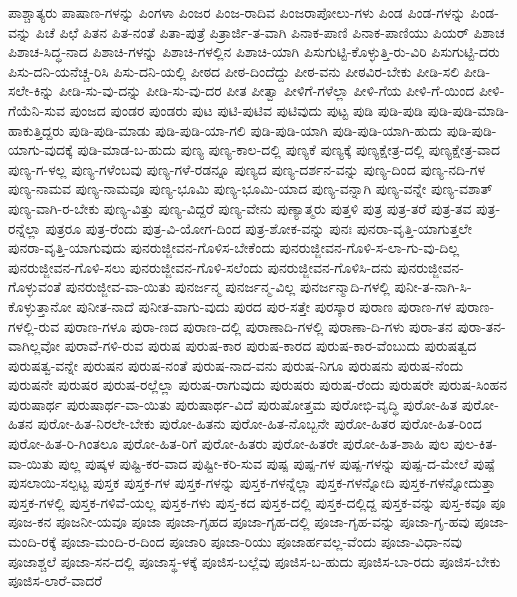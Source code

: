 {ಪಾಶ್ಚಾತ್ಯರು
ಪಾಷಾಣ-ಗಳನ್ನು
ಪಿಂಗಳಾ
ಪಿಂಜರ
ಪಿಂಜ-ರಾದಿವ
ಪಿಂಜರಾಪೋಲು-ಗಳು
ಪಿಂಡ
ಪಿಂಡ-ಗಳನ್ನು
ಪಿಂಡ-ವನ್ನು
ಪಿಚೆ
ಪಿಛೆ
ಪಿತನ
ಪಿತ-ನಂತೆ
ಪಿತಾ-ಪುತ್ರೆ
ಪಿತ್ರಾರ್ಜಿ-ತ-ವಾಗಿ
ಪಿನಾಕ-ಪಾಣಿ
ಪಿನಾಕ-ಪಾಣಿಯು
ಪಿಯರ್
ಪಿಶಾಚ
ಪಿಶಾಚ-ಸಿದ್ಧ-ನಾದ
ಪಿಶಾಚಿ-ಗಳನ್ನು
ಪಿಶಾಚಿ-ಗಳಲ್ಲಿನ
ಪಿಶಾಚಿ-ಯಾಗಿ
ಪಿಸುಗುಟ್ಟಿ-ಕೊಳ್ಳುತ್ತಿ-ರು-ವಿರಿ
ಪಿಸುಗುಟ್ಟಿ-ದರು
ಪಿಸು-ದನಿ-ಯನೆಚ್ಚ-ರಿಸಿ
ಪಿಸು-ದನಿ-ಯಲ್ಲಿ
ಪೀಠದ
ಪೀಠ-ದಿಂದೆದ್ದು
ಪೀಠ-ವನು
ಪೀಠವಿರ-ಬೇಕು
ಪೀಡಿ-ಸಲಿ
ಪೀಡಿ-ಸಲೇ-ಕಿನ್ನು
ಪೀಡಿ-ಸು-ವು-ದನ್ನು
ಪೀಡಿ-ಸು-ವು-ದರ
ಪೀತ
ಪೀತ್ವಾ
ಪೀಳಿಗೆ-ಗಳೆಲ್ಲಾ
ಪೀಳಿ-ಗೆಯ
ಪೀಳಿ-ಗೆ-ಯಿಂದ
ಪೀಳಿ-ಗೆಯೆನಿ-ಸುವ
ಪುಂಜದ
ಪುಂಡರ
ಪುಂಡರು
ಪುಟ
ಪುಟಿ-ಪುಟಿವ
ಪುಟಿವುದು
ಪುಟ್ಟ
ಪುಡಿ
ಪುಡಿ-ಪುಡಿ
ಪುಡಿ-ಪುಡಿ-ಮಾಡಿ-ಹಾಕುತ್ತಿದ್ದರು
ಪುಡಿ-ಪುಡಿ-ಮಾಡು
ಪುಡಿ-ಪುಡಿ-ಯಾ-ಗಲಿ
ಪುಡಿ-ಪುಡಿ-ಯಾಗಿ
ಪುಡಿ-ಪುಡಿ-ಯಾಗಿ-ಹುದು
ಪುಡಿ-ಪುಡಿ-ಯಾಗು-ವುದಕ್ಕೆ
ಪುಡಿ-ಮಾಡ-ಬ-ಹುದು
ಪುಣ್ಯ
ಪುಣ್ಯ-ಕಾಲ-ದಲ್ಲಿ
ಪುಣ್ಯಕೆ
ಪುಣ್ಯಕ್ಕೆ
ಪುಣ್ಯಕ್ಷೇತ್ರ-ದಲ್ಲಿ
ಪುಣ್ಯಕ್ಷೇತ್ರ-ವಾದ
ಪುಣ್ಯ-ಗ-ಳಲ್ಲ
ಪುಣ್ಯ-ಗಳೆಂಬವು
ಪುಣ್ಯ-ಗಳೆ-ರಡನ್ನೂ
ಪುಣ್ಯದ
ಪುಣ್ಯ-ದರ್ಶನ-ವನ್ನು
ಪುಣ್ಯ-ದಿಂದ
ಪುಣ್ಯ-ನದಿ-ಗಳ
ಪುಣ್ಯ-ನಾಮವ
ಪುಣ್ಯ-ನಾಮವೂ
ಪುಣ್ಯ-ಭೂಮಿ
ಪುಣ್ಯ-ಭೂಮಿ-ಯಾದ
ಪುಣ್ಯ-ವನ್ನಾಗಿ
ಪುಣ್ಯ-ವನ್ನೇ
ಪುಣ್ಯ-ವಶಾತ್
ಪುಣ್ಯ-ವಾಗಿ-ರ-ಬೇಕು
ಪುಣ್ಯ-ವಿತ್ತು
ಪುಣ್ಯ-ವಿದ್ದರೆ
ಪುಣ್ಯ-ವೇನು
ಪುಣ್ಯಾತ್ಮರು
ಪುತ್ತಳಿ
ಪುತ್ರ
ಪುತ್ರ-ತರೆ
ಪುತ್ರ-ತವ
ಪುತ್ರ-ರನ್ನೆಲ್ಲಾ
ಪುತ್ರರೂ
ಪುತ್ರ-ರೆಂದು
ಪುತ್ರ-ವಿ-ಯೋಗ-ದಿಂದ
ಪುತ್ರ-ಶೋಕ-ವನ್ನು
ಪುನಃ
ಪುನರಾ-ವೃತ್ತಿ-ಯಾಗುತ್ತಲೇ
ಪುನರಾ-ವೃತ್ತಿ-ಯಾಗುವುದು
ಪುನರುಜ್ಜೀವನ-ಗೊಳಿಸ-ಬೇಕೆಂದು
ಪುನರುಜ್ಜೀವನ-ಗೊಳಿ-ಸ-ಲಾ-ಗು-ವು-ದಿಲ್ಲ
ಪುನರುಜ್ಜೀವನ-ಗೊಳಿ-ಸಲು
ಪುನರುಜ್ಜೀವನ-ಗೊಳಿ-ಸಲೆಂದು
ಪುನರುಜ್ಜೀವನ-ಗೊಳಿಸಿ-ದನು
ಪುನರುಜ್ಜೀವನ-ಗೊಳ್ಳುವಂತೆ
ಪುನರುಜ್ಜೀವ-ವಾ-ಯಿತು
ಪುನರ್ಜನ್ಮ
ಪುನರ್ಜನ್ಮ-ವಿಲ್ಲ
ಪುನರ್ಜನ್ಮಾದಿ-ಗಳಲ್ಲಿ
ಪುನೀ-ತ-ನಾಗಿ-ಸಿ-ಕೊಳ್ಳುತ್ತಾನೋ
ಪುನೀತ-ನಾದೆ
ಪುನೀತ-ವಾಗು-ವುದು
ಪುರದ
ಪುರ-ಸತ್ತೇ
ಪುರಸ್ಕಾರ
ಪುರಾಣ
ಪುರಾಣ-ಗಳ
ಪುರಾಣ-ಗಳಲ್ಲಿ-ರುವ
ಪುರಾಣ-ಗಳೂ
ಪುರಾ-ಣದ
ಪುರಾಣ-ದಲ್ಲಿ
ಪುರಾಣಾದಿ-ಗಳಲ್ಲಿ
ಪುರಾಣಾ-ದಿ-ಗಳು
ಪುರಾ-ತನ
ಪುರಾ-ತನ-ವಾಗಿಲ್ಲವೋ
ಪುರಾವೆ-ಗಳಿ-ರುವ
ಪುರುಷ
ಪುರುಷ-ಕಾರ
ಪುರುಷ-ಕಾರದ
ಪುರುಷ-ಕಾರ-ವೆಂಬುದು
ಪುರುಷತ್ವದ
ಪುರುಷತ್ವ-ವನ್ನೇ
ಪುರುಷನ
ಪುರುಷ-ನಂತೆ
ಪುರುಷ-ನಾದ-ವನು
ಪುರುಷ-ನಿಗೂ
ಪುರುಷನು
ಪುರುಷ-ನೆಂದು
ಪುರುಷನೇ
ಪುರುಷರ
ಪುರುಷ-ರಲ್ಲೆಲ್ಲಾ
ಪುರುಷ-ರಾಗುವುದು
ಪುರುಷರು
ಪುರುಷ-ರೆಂದು
ಪುರುಷರೇ
ಪುರುಷ-ಸಿಂಹನ
ಪುರುಷಾರ್ಥ
ಪುರುಷಾರ್ಥ-ವಾ-ಯಿತು
ಪುರುಷಾರ್ಥ-ವಿದೆ
ಪುರುಷೋತ್ತಮ
ಪುರೋಭಿ-ವೃದ್ಧಿ
ಪುರೋ-ಹಿತ
ಪುರೋ-ಹಿತನ
ಪುರೋ-ಹಿತ-ನಿರಲೇ-ಬೇಕು
ಪುರೋ-ಹಿತನು
ಪುರೋ-ಹಿತ-ನೊಬ್ಬನೇ
ಪುರೋ-ಹಿತರ
ಪುರೋ-ಹಿತ-ರಿಂದ
ಪುರೋ-ಹಿತ-ರಿ-ಗಿಂತಲೂ
ಪುರೋ-ಹಿತ-ರಿಗೆ
ಪುರೋ-ಹಿತರು
ಪುರೋ-ಹಿತರೇ
ಪುರೋ-ಹಿತ-ಶಾಹಿ
ಪುಲ
ಪುಲ-ಕಿತ-ವಾ-ಯಿತು
ಪುಲ್ಲ
ಪುಷ್ಕಳ
ಪುಷ್ಟಿ-ಕರ-ವಾದ
ಪುಷ್ಟೀ-ಕರಿ-ಸುವ
ಪುಷ್ಪ
ಪುಷ್ಪ-ಗಳ
ಪುಷ್ಪ-ಗಳನ್ನು
ಪುಷ್ಪ-ದ-ಮೇಲೆ
ಪುಷ್ಪೆ
ಪುಸಲಾಯಿ-ಸಲ್ಪಟ್ಟ
ಪುಸ್ತಕ
ಪುಸ್ತಕ-ಗಳ
ಪುಸ್ತಕ-ಗಳನ್ನು
ಪುಸ್ತಕ-ಗಳನ್ನೆಲ್ಲಾ
ಪುಸ್ತಕ-ಗಳನ್ನೋದಿ
ಪುಸ್ತಕ-ಗಳನ್ನೋದುತ್ತಾ
ಪುಸ್ತಕ-ಗಳಲ್ಲಿ
ಪುಸ್ತಕ-ಗಳಿವೆ-ಯಲ್ಲ
ಪುಸ್ತಕ-ಗಳು
ಪುಸ್ತ-ಕದ
ಪುಸ್ತಕ-ದಲ್ಲಿ
ಪುಸ್ತಕ-ದಲ್ಲಿದ್ದ
ಪುಸ್ತಕ-ವನ್ನು
ಪುಸ್ತ-ಕವೂ
ಪೂ
ಪೂಜ-ಕನ
ಪೂಜನೀ-ಯವೂ
ಪೂಜಾ
ಪೂಜಾ-ಗೃಹದ
ಪೂಜಾ-ಗೃಹ-ದಲ್ಲಿ
ಪೂಜಾ-ಗೃಹ-ವನ್ನು
ಪೂಜಾ-ಗೃ-ಹವು
ಪೂಜಾ-ಮಂದಿ-ರಕ್ಕೆ
ಪೂಜಾ-ಮಂದಿ-ರ-ದಿಂದ
ಪೂಜಾರಿ
ಪೂಜಾ-ರಿಯು
ಪೂಜಾರ್ಹವಲ್ಲ-ವೆಂದು
ಪೂಜಾ-ವಿಧಾ-ನವು
ಪೂಜಾಶ್ಚಲೆ
ಪೂಜಾ-ಸನ-ದಲ್ಲಿ
ಪೂಜಾಸ್ಥ-ಳಕ್ಕೆ
ಪೂಜಿಸ-ಬಲ್ಲೆವು
ಪೂಜಿಸ-ಬ-ಹುದು
ಪೂಜಿಸ-ಬಾ-ರದು
ಪೂಜಿಸ-ಬೇಕು
ಪೂಜಿಸ-ಲಾರೆ-ವಾದರೆ
}
